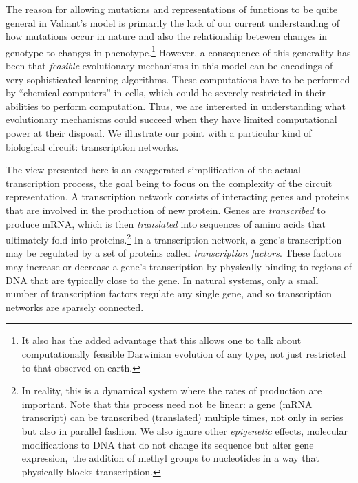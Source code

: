 \documentclass{acmtr2e}
\begin{document}
The reason for allowing mutations and representations of functions to be quite
general in Valiant's model is primarily the lack of our current understanding of
how mutations occur in nature and also the relationship betewen changes in genotype to
changes in phenotype.\footnote{It also has the added advantage that this allows
one to talk about computationally feasible Darwinian evolution of any type, not
just restricted to that observed on earth.} However, a consequence of this
generality has been that \emph{feasible} evolutionary mechanisms in this model
can be encodings of very sophisticated learning algorithms. These computations
have to be performed by ``chemical computers'' in cells, which could be severely
restricted in their abilities to perform computation. Thus, we are interested in
understanding what evolutionary mechanisms could succeed when they have limited
computational power at their disposal. We illustrate our point with a particular
kind of biological circuit: transcription networks.

The view presented here is an exaggerated simplification of the actual
transcription process, the goal being to focus on the complexity of the circuit
representation. A transcription network consists of 
interacting genes and proteins that are involved in the production of new
protein. Genes are \emph{transcribed} to produce mRNA, which is then
\emph{translated} into sequences of amino acids that ultimately fold into
proteins.\footnote{In reality, this is a dynamical system where the rates of
production are important. Note that this process need not be linear: a gene (mRNA
transcript) can be transcribed (translated) multiple times, not only in series
but also in parallel fashion.  We also ignore
other \emph{epigenetic} effects, \ie molecular modifications to DNA that do not
change its sequence but alter gene expression,~\eg the addition of methyl groups
to nucleotides in a way that physically blocks transcription.}
In a transcription network, a gene's transcription may be regulated by a set of
proteins called \emph{transcription factors}.
These factors may increase or decrease a gene's transcription by
physically binding to regions of DNA that are typically close to the gene.
In natural systems, only a small number of transcription factors
regulate any single gene, and so transcription networks are sparsely connected.
\end{document}
